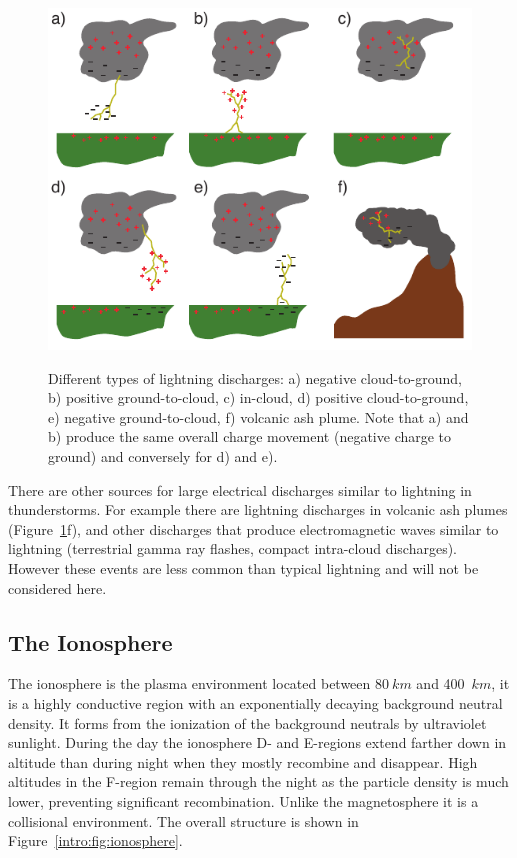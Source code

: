 \begin{figure}[ht!]
	\centering
	\includegraphics[scale=1]{Introduction/Figures/lightning_types.pdf}\\
	\caption{Different types of lightning discharges:
			a) negative cloud-to-ground,
			b) positive ground-to-cloud,
			c) in-cloud,
			d) positive cloud-to-ground,
			e) negative ground-to-cloud,
			f) volcanic ash plume.
			Note that a) and b) produce the same overall charge movement (negative charge to ground) and conversely for d) and e).}
	\label{intro:fig:types}
\end{figure}

There are other sources for large electrical discharges similar to lightning in thunderstorms.
For example there are lightning discharges in volcanic ash plumes (Figure~\ref{intro:fig:types}f), and other discharges that produce electromagnetic waves similar to lightning (terrestrial gamma ray flashes, compact intra-cloud discharges).
However these events are less common than typical lightning and will not be considered here.

\subsection{The Ionosphere}

The ionosphere is the plasma environment located between $80~km$ and 400~$km$, it is a highly conductive region with an exponentially decaying background neutral density.
It forms from the ionization of the background neutrals by ultraviolet sunlight.
During the day the ionosphere D- and E-regions extend farther down in altitude than during night when they mostly recombine and disappear.
High altitudes in the F-region remain through the night as the particle density is much lower, preventing significant recombination.
Unlike the magnetosphere it is a collisional environment.
The overall structure is shown in Figure~\ref{intro:fig:ionosphere}.

